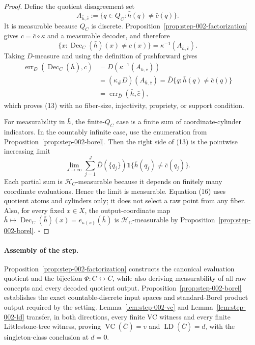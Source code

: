 \begin{proof}
Define the quotient disagreement set
\[
A_{\bar h,\bar c}:=\{q\in Q_C:\bar h(q)\ne\bar c(q)\}.
\tag{14}
\]
It is measurable because \(Q_C\) is discrete. Proposition~\ref{prop:step-002-factorization}
gives \(c=\bar c\circ\kappa\) and a measurable decoder, and therefore
\[
\{x:\operatorname{Dec}_C(\bar h)(x)\ne c(x)\}
=\kappa^{-1}(A_{\bar h,\bar c}).
\tag{15}
\]
Taking \(D\)-measure and using the definition of pushforward gives
\[
\begin{aligned}
\operatorname{err}_D(\operatorname{Dec}_C(\bar h),c)
&=D(\kappa^{-1}(A_{\bar h,\bar c}))\\
&=(\kappa_\#D)(A_{\bar h,\bar c})
=\bar D\{q:\bar h(q)\ne\bar c(q)\}\\
&=\operatorname{err}_{\bar D}(\bar h,\bar c),
\end{aligned}
\]
which proves (13) with no fiber-size, injectivity, propriety, or support
condition.

For measurability in \(\bar h\), the finite-\(Q_C\) case is a finite sum of
coordinate-cylinder indicators. In the countably infinite case, use the
enumeration from Proposition~\ref{prop:step-002-borel}. Then the right side
of (13) is the pointwise increasing limit
\[
\lim_{J\to\infty}
\sum_{j=1}^J \bar D(\{q_j\})
\mathbf 1\{\bar h(q_j)\ne\bar c(q_j)\}.
\tag{16}
\]
Each partial sum is \(\mathcal H_C\)-measurable because it depends on finitely
many coordinate evaluations. Hence the limit is measurable. Equation (16)
uses quotient atoms and cylinders only; it does not select a raw point from
any fiber. Also, for every fixed \(x\in X\), the output-coordinate map
\(\bar h\mapsto\operatorname{Dec}_C(\bar h)(x)=e_{\kappa(x)}(\bar h)\) is
\(\mathcal H_C\)-measurable by Proposition~\ref{prop:step-002-borel}.
\(\square\)


\end{proof}

\paragraph{Assembly of the step.}


Proposition~\ref{prop:step-002-factorization} constructs the canonical
evaluation quotient and the bijection \(\Phi:C\leftrightarrow\bar C\), while
also deriving measurability of all raw concepts and every decoded quotient
output. Proposition~\ref{prop:step-002-borel} establishes the exact
countable-discrete input spaces and standard-Borel product output required by
the setting. Lemma~\ref{lem:step-002-vc} and
Lemma~\ref{lem:step-002-ld} transfer, in both directions, every finite VC
witness and every finite Littlestone-tree witness, proving
\(\operatorname{VC}(\bar C)=v\) and \(\operatorname{LD}(\bar C)=d\), with
the singleton-class conclusion at \(d=0\).

